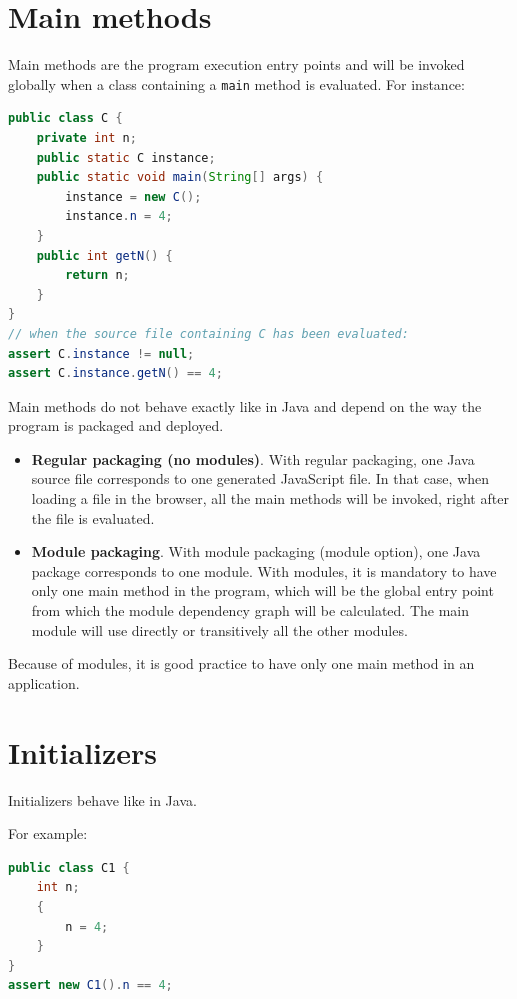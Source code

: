 \documentclass[a4paper]{report}
\begin{document}
\section{Main methods}

Main methods are the program execution entry points and will be invoked globally when a class containing a \texttt{main} method is evaluated. For instance:

\begin{lstlisting}[language=Java]
public class C {
	private int n;
	public static C instance;
	public static void main(String[] args) {
		instance = new C();
		instance.n = 4;
	}
	public int getN() {
		return n;
	}
}
// when the source file containing C has been evaluated:
assert C.instance != null;
assert C.instance.getN() == 4;
\end{lstlisting}

Main methods do not behave exactly like in Java and depend on the way the program is packaged and deployed. 

\begin{itemize}
\item \textbf{Regular packaging (no modules)}. With regular packaging, one Java source file corresponds to one generated JavaScript file. In that case, when loading a file in the browser, all the main methods will be invoked, right after the file is evaluated. 
\item \textbf{Module packaging}. With module packaging (module option), one Java package corresponds to one module. With modules, it is mandatory to have only one main method in the program, which will be the global entry point from which the module dependency graph will be calculated. The main module will use directly or transitively all the other modules.
\end{itemize}

Because of modules, it is good practice to have only one main method in an application.

\section{Initializers}

Initializers behave like in Java.

\noindent
For example:

\begin{lstlisting}[language=Java]
public class C1 {
	int n;
	{
		n = 4;
	}
}
assert new C1().n == 4;
\end{lstlisting}
\end{document}
